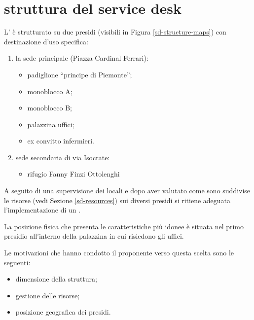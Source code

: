 %
%
\section[Struttura del Service Desk]{struttura del service desk}
\label{sd-structure}
L'\entity{} è strutturato su due presidi (visibili in Figura \ref{sd-structure-maps}) con destinazione d'uso specifica:

\begin{enumerate}
\item{la sede principale (Piazza Cardinal Ferrari):}
\begin{itemize}
\item{padiglione ``principe di Piemonte'';}
\item{monoblocco A;}
\item{monoblocco B;}
\item{palazzina uffici;}
\item{ex convitto infermieri.}
\end{itemize}
\item{sede secondaria di via Isocrate:}
\begin{itemize}
\item{rifugio Fanny Finzi Ottolenghi}
\end{itemize}
\end{enumerate}

A seguito di una supervisione dei locali e dopo aver valutato come sono suddivise le risorse (vedi Sezione \ref{sd-resources}) sui diversi presidi si ritiene adeguata l'implementazione di un .

La posizione fisica che presenta le caratteristiche più idonee è situata nel primo presidio all'interno della palazzina in cui risiedono gli uffici.

Le motivazioni che hanno condotto il proponente verso questa scelta sono le seguenti:

\begin{itemize}
\item{dimensione della struttura;}
\item{gestione delle risorse;}
\item{posizione geografica dei presidi.}
\end{itemize}


